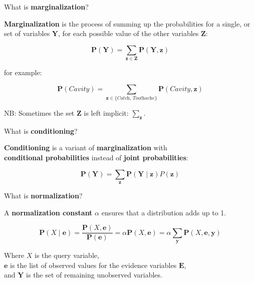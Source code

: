\begin{flashcard}[Question]{What is \textbf{marginalization}?}

\textbf{Marginalization} is the process of summing up the probabilities for a single, or set of variables $\mathbf{Y}$, for each possible value of the other variables $\mathbf{Z}$:

\begin{displaymath}
\mathbf{P}(\mathbf{Y}) = \sum_{\mathbf{z} \in \mathbf{Z}} \mathbf{P(Y, z)}
\end{displaymath}

\begin{center}
for example:
\end{center}

\begin{displaymath}
\mathbf{P}(\textit{Cavity}) = \sum_{\mathbf{z} \in \{\textit{Catch, Toothache}\}} \mathbf{P}(\textit{Cavity}, \mathbf{z})
\end{displaymath}

\begin{center}
NB: Sometimes the set $\mathbf{Z}$ is left implicit: $\sum_{\mathbf{z}}$.
\end{center}

\end{flashcard}

\begin{flashcard}[Question]{What is \textbf{conditioning}?}

\begin{center}
\textbf{Conditioning} is a variant of \textbf{marginalization} with\\\textbf{conditional probabilities} instead of \textbf{joint probabilities}:
\end{center}

\begin{displaymath}
\mathbf{P(Y)} = \sum_{\mathbf{z}}\mathbf{P(Y \mid z)}P(\mathbf{z})
\end{displaymath}

\end{flashcard}

\begin{flashcard}[Question]{What is \textbf{normalization}?}

\begin{center}
A \textbf{normalization constant} $\alpha$ ensures that a distribution adds up to 1.
\end{center}

\begin{displaymath}
\mathbf{P}(X \mid \mathbf{e}) = \frac{\mathbf{P}(X, \mathbf{e})}{\mathbf{P(e)}} = \alpha \mathbf{P}(X, \mathbf{e}) = \alpha \sum_\mathbf{y} \mathbf{P}(X, \mathbf{e}, \mathbf{y})
\end{displaymath}

\begin{center}
Where $X$ is the query variable,\\$\mathbf{e}$ is the list of observed values for the evidence variables $\mathbf{E}$,\\and $\mathbf{Y}$ is the set of remaining unobserved variables.
\end{center}

\end{flashcard}

